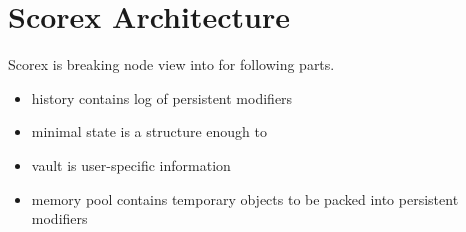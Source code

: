 
\section{Scorex Architecture}

Scorex is breaking node view into for following parts. 

\begin{itemize}
\item{history} contains log of persistent modifiers
\item{minimal state} is a structure enough to 
\item{vault} is user-specific information
\item{memory pool} contains temporary objects to be packed into persistent modifiers 
\end{itemize}